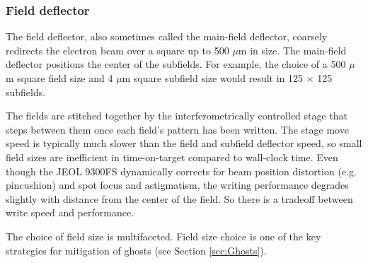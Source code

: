 \documentclass[]{spie}  %
\begin{document}
\subsubsection{Field deflector}
\label{sec:Field}
The field deflector, also sometimes called the main-field deflector, coarsely redirects the electron beam over a square up to 500 $\mu$m in size.  The main-field deflector positions the center of the subfields.  For example, the choice of a 500 $\mu$m square field size and 4 $\mu$m square subfield size would result in 125 $\times$ 125 subfields.

The fields are stitched together by the interferometrically controlled stage that steps between them once each field's pattern has been written.  The stage move speed is typically much slower than the field and subfield deflector speed, so small field sizes are inefficient in time-on-target compared to wall-clock time.  Even though the JEOL 9300FS dynamically corrects for beam position distortion (e.g. pincushion) and spot focus and astigmatism, the writing performance degrades slightly with distance from the center of the field.  So there is a tradeoff between write speed and performance.  

The choice of field size is multifaceted.  Field size choice is one of the key strategies for mitigation of ghosts (see Section \ref{sec:Ghosts}).
\end{document}
